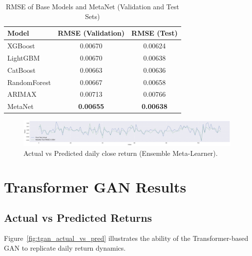 \begin{table}[h!]
\centering
\caption{RMSE of Base Models and MetaNet (Validation and Test Sets)}
\label{tab:ensemble_base_models}
\begin{tabular}{lcc}
\toprule
\textbf{Model} & \textbf{RMSE (Validation)} & \textbf{RMSE (Test)} \\
\midrule
XGBoost     & 0.00670 & 0.00624 \\
LightGBM    & 0.00670 & 0.00638 \\
CatBoost    & 0.00663 & 0.00636 \\
RandomForest & 0.00667 & 0.00658 \\
ARIMAX      & 0.00713 & 0.00766 \\
MetaNet     & \textbf{0.00655} & \textbf{0.00638} \\
\bottomrule
\end{tabular}
\end{table}

\begin{figure}[h!]
    \centering
    \includegraphics[width=\textwidth]{Images/metanet_final_test_plot_s.pdf}
    \caption{Actual vs Predicted daily close return (Ensemble Meta-Learner).}
    \label{fig:ensemble_actual_vs_pred}
\end{figure}

\section{Transformer GAN Results}
\subsection{Actual vs Predicted Returns}
Figure~\ref{fig:tgan_actual_vs_pred} illustrates the ability of the Transformer-based GAN to replicate daily return dynamics.


